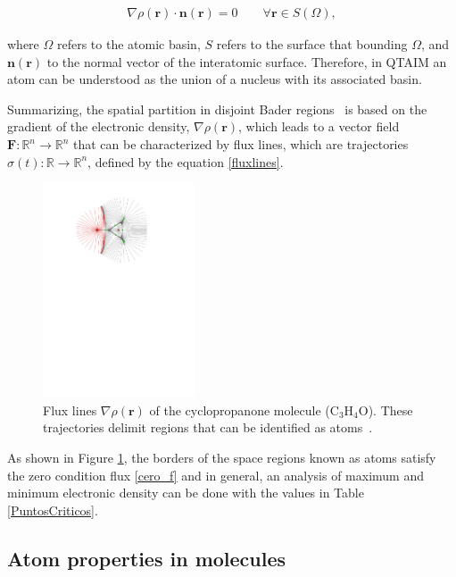 \begin{align}
  \nabla\rho(\mathbf{r})\cdot\mathbf{n(r)} = 0 \qquad \forall\mathbf{r}\in S(\Omega),
\label{cero_f}
\end{align}

\noindent where $\Omega$ refers to the atomic basin, $S$ refers to the surface
that bounding $\Omega$, and $\mathbf{n}(\mathbf{r})$ to the normal vector of
the interatomic surface.  Therefore, in QTAIM an atom can be understood as the
union of a nucleus with its associated basin.

Summarizing, the spatial partition in disjoint Bader regions~\cite{bader} is
based on the gradient of the electronic density, $\nabla \rho(\mathbf{r})$,
which leads to a vector field $\mathbf{F}:\mathbb{R}^{n} \to \mathbb{R}^{n}$
that can be characterized by flux lines, which are trajectories
$\sigma(t):\mathbb{R} \to \mathbb{R}^{n}$, defined by the equation
\ref{fluxlines}.

\begin{figure}
  \centering
  \includegraphics[width=0.4\textwidth]{3/img/flux}
  \caption{Flux lines $\nabla \rho(\mathbf{r})$ of the cyclopropanone molecule
  (C$_3$H$_4$O). These trajectories delimit regions that can be identified as
  atoms~\cite{todd}.}
\label{flux}
\end{figure}

As shown in Figure \ref{flux}, the borders of the space regions known as atoms
satisfy the zero condition flux \ref{cero_f} and in general, an analysis of
maximum and minimum electronic density can be done with the values in Table
\ref{PuntosCriticos}.

\subsection{Atom properties in molecules}

